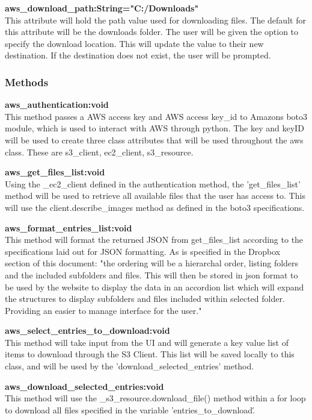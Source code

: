 \textbf{aws\_download\_path:String="C:/Downloads"} \\
    This attribute will hold the path value used for downloading files. The default for this attribute will be the downloads folder. The user 
    will be given the option to specify the download location. This will update the value to their new destination. If the destination does 
    not exist, the user will be prompted.

\subsubsection{Methods}
\textbf{aws\_authentication:void} \\
    This method passes a AWS access key and AWS access key\_id to Amazons boto3 module, which is used to interact with AWS through python. The key 
    and keyID will be used to create three class attributes that will be used throughout the aws class. These are s3\_client, ec2\_client, s3\_resource.
    
\textbf{aws\_get\_files\_list:void} \\
    Using the \_ec2\_client defined in the authentication method, the 'get\_files\_list' method will be used to retrieve all available files that the user 
    has access to. This will use the client.describe\_images method as defined in the boto3 specifications.

\textbf{aws\_format\_entries\_list:void} \\
    This method will format the returned JSON from get\_files\_list according to the specifications laid out for JSON formatting. As is specified in the
    Dropbox section of this document: "the ordering will be a hierarchal order, listing folders and the included subfolders and files. This will then be stored in json format to be used by the website to display the data in an
    accordion list which will expand the structures to display subfolders and files included within selected folder. Providing an easier to manage
    interface for the user."

\textbf{aws\_select\_entries\_to\_download:void} \\
    This method will take input from the UI and will generate a key value list of items to download through the S3 Client. This list will be saved locally to this class,
    and will be used by the 'download\_selected\_entries' method.

\textbf{aws\_download\_selected\_entries:void} \\
    This method will use the \_s3\_resource.download\_file() method within a for loop to download all files specified in the variable 'entries\_to\_download\'.

